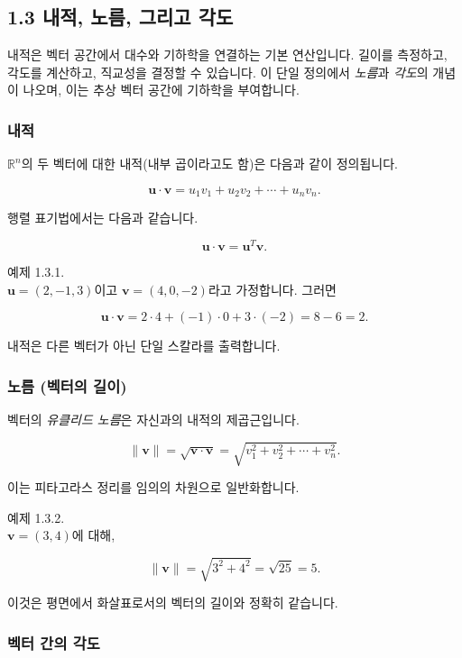 \documentclass[
  12pt,
  a4paper,
]{article}
\begin{document}
\subsection{1.3 내적, 노름, 그리고
각도}\label{13-dot-product-norms-and-angles}

내적은 벡터 공간에서 대수와
기하학을 연결하는 기본 연산입니다. 길이를 측정하고, 각도를 계산하고, 직교성을 결정할 수 있습니다. 이 단일 정의에서 \emph{노름}과 \emph{각도}의 개념이 나오며, 이는 추상 벡터 공간에 기하학을 부여합니다.

\subsubsection{내적}\label{the-dot-product}

\(\mathbb{R}^n\)의 두 벡터에 대한 내적(내부 곱이라고도 함)은 다음과 같이 정의됩니다.

\[\mathbf{u} \cdot \mathbf{v} = u_1 v_1 + u_2 v_2 + \cdots + u_n v_n.\]

행렬 표기법에서는 다음과 같습니다.

\[\mathbf{u} \cdot \mathbf{v} = \mathbf{u}^T \mathbf{v}.\]

예제 1.3.1.\\
\(\mathbf{u} = (2, -1, 3)\)이고 \(\mathbf{v} = (4, 0, -2)\)라고 가정합니다. 그러면

\[\mathbf{u} \cdot \mathbf{v} = 2\cdot 4 + (-1)\cdot 0 + 3\cdot (-2) = 8 - 6 = 2.\]

내적은 다른 벡터가 아닌 단일 스칼라를 출력합니다.

\subsubsection{노름 (벡터의
길이)}\label{norms-length-of-a-vector}

벡터의 \emph{유클리드 노름}은 자신과의 내적의 제곱근입니다.

\[\|\mathbf{v}\| = \sqrt{\mathbf{v} \cdot \mathbf{v}} = \sqrt{v_1^2 + v_2^2 + \cdots + v_n^2}.\]

이는 피타고라스 정리를 임의의 차원으로 일반화합니다.

예제 1.3.2.\\
\(\mathbf{v} = (3, 4)\)에 대해,

\[\|\mathbf{v}\| = \sqrt{3^2 + 4^2} = \sqrt{25} = 5.\]

이것은 평면에서 화살표로서의 벡터의 길이와 정확히 같습니다.

\subsubsection{벡터 간의 각도}\label{angles-between-vectors}
\end{document}

